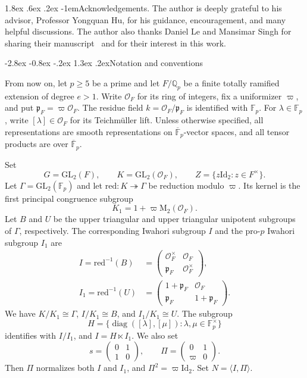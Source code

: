 \documentclass[10pt]{article}
\makeatletter
\renewcommand\section{\@startsection{section}{1}{\z@}%
  {-2.8ex \@plus -0.8ex \@minus -.2ex}%
  {1.3ex \@plus .2ex}{\normalfont\Large\bfseries}}
\renewcommand\paragraph{\@startsection{paragraph}{4}{\z@}%
  {1.8ex \@plus .6ex \@minus .2ex}%
  {-1em}{\normalfont\normalsize\bfseries}}
\theoremstyle{plain}
\theoremstyle{definition}
\theoremstyle{remark}
\newcommand{\Qp}{\mathbb{Q}_p}
\newcommand{\Fp}{\mathbb{F}_p}
\newcommand{\Fpbar}{\overline{\mathbb{F}}_p}
\newcommand{\GL}{\mathrm{GL}}
\newcommand{\Mat}{\mathrm{M}}
\newcommand{\Id}{\mathrm{Id}}
\makeatother
\begin{document}
\paragraph{Acknowledgements.}
The author is deeply grateful to his advisor, Professor Yongquan Hu, for his guidance, encouragement, and many helpful discussions. The author also thanks Daniel Le and Mansimar Singh for sharing their manuscript~\cite{LS26} and for their interest in this work.

\section{Notation and conventions}\label{sec:notation}

From now on, let $p\geq 5$ be a prime and let $F/\Qp$ be a finite totally ramified extension of degree $e>1$. Write $\mathcal{O}_F$ for its ring of integers, fix a uniformizer $\varpi$, and put $\mathfrak{p}_F=\varpi\mathcal{O}_F$. The residue field $k=\mathcal{O}_F/\mathfrak{p}_F$ is identified with $\Fp$. For $\lambda\in\Fp$, write $[\lambda]\in\mathcal{O}_F$ for its Teichm\"uller lift. Unless otherwise specified, all representations are smooth representations on $\Fpbar$-vector spaces, and all tensor products are over $\Fpbar$.

Set
\[
G=\GL_2(F),\qquad K=\GL_2(\mathcal{O}_F),\qquad
Z=\{z\Id_2:z\in F^\times\}.
\]
Let $\Gamma=\GL_2(\Fp)$ and let $\mathrm{red}:K\twoheadrightarrow\Gamma$ be reduction modulo $\varpi$. Its kernel is the first principal congruence subgroup
\[
K_1=1+\varpi\Mat_2(\mathcal{O}_F).
\]
Let $B$ and $U$ be the upper triangular and upper triangular unipotent subgroups of $\Gamma$, respectively. The corresponding Iwahori subgroup $I$ and the pro-$p$ Iwahori subgroup $I_1$ are
\begin{align*}
I=\mathrm{red}^{-1}(B)
&=\begin{pmatrix}
\mathcal{O}_F^\times & \mathcal{O}_F\\
\mathfrak{p}_F & \mathcal{O}_F^\times
\end{pmatrix},\\
I_1=\mathrm{red}^{-1}(U)
&=\begin{pmatrix}
1+\mathfrak{p}_F & \mathcal{O}_F\\
\mathfrak{p}_F & 1+\mathfrak{p}_F
\end{pmatrix}.
\end{align*}
We have $K/K_1\cong\Gamma$, $I/K_1\cong B$, and $I_1/K_1\cong U$. The subgroup
\[
H=\{\operatorname{diag}([\lambda],[\mu]):\lambda,\mu\in\Fp^\times\}
\]
identifies with $I/I_1$, and $I=H\ltimes I_1$. We also set
\[
s=\begin{pmatrix}0&1\\1&0\end{pmatrix},\qquad
\Pi=\begin{pmatrix}0&1\\\varpi&0\end{pmatrix}.
\]
Then $\Pi$ normalizes both $I$ and $I_1$, and $\Pi^2=\varpi\Id_2$.
Set $N=\langle I,\Pi\rangle$.
\end{document}

